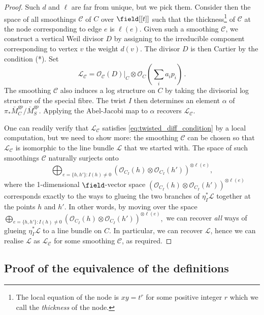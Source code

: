 \documentclass[a4paper,12pt]{article} %
\newcommand{\ca}[1]{{\mathcal{#1}}}
\theoremstyle{definition}
\theoremstyle{plain}%
\begin{document}
\begin{proof}
Such $d$ and $\ell$ are far from unique, but we pick them. Consider then the space of all smoothings $\ca C$ of $C$ over ${\field}[[t]]$ such that the thickness\footnote{The local equation of the node is $xy = t^r$ for some positive integer $r$ which we call the \emph{thickness} of the node. } of $\ca C$ at the node corresponding to edge $e$ is $\ell(e)$. Given such a smoothing $\ca C$, we construct a vertical Weil divisor $D$ by assigning to the irreducible component corresponding to vertex $v$ the weight $d(v)$. The divisor $D$ is then Cartier by the condition (*). Set $$\ca L_{\ca C} = \ca O_{\ca C}(D)|_{C}\otimes \ca O_C(\sum_i a_i p_i)\, .$$
The smoothing $\ca C$ also induces a log structure on $C$ by  taking the divisorial log structure of the special fibre. The twist $I$ then determines an element $\alpha$ of $\pi_*\bar M_C^{gp}/\bar M_S^{gp}$. Applying the Abel-Jacobi map to $\alpha$ recovers $\ca L_{\ca C}$. 

One can readily verify that $\ca L_{\ca C}$ satisfies \eqref{eq:twisted_diff_condition} by a local computation, but we need to show more:  the smoothing $\ca C$ can be chosen so that $\ca L_{\ca C}$ is isomorphic to the line bundle $\ca L$ that we started with. The space of such smoothings $\ca C$ naturally surjects onto 
\begin{equation}
\bigoplus_{e = \{ h, h'\} : I(h) \neq 0} \left( \ca O_{C_I}(h) \otimes \ca O_{C_I}(h')\right)^{\otimes \ell(e)}, 
\end{equation}
where the 1-dimensional $\field$-vector space $\left( \ca O_{C_I}(h) \otimes \ca O_{C_I}(h')\right)^{\otimes \ell(e)}$ corresponds exactly to the ways to glueing the two branches of $\eta_I^*\ca L$ together at the points $h$ and $h'$. In other words, by moving over the space $\bigoplus_{e = \{ h, h'\} : I(h) \neq 0} \left( \ca O_{C_I}(h) \otimes \ca O_{C_I}(h')\right)^{\otimes \ell(e)}, $ we can recover \emph{all} ways of glueing $\eta_I^*\ca L$ to a line bundle on $C$. In particular, we can recover $\ca L$, hence we can realise $\ca L$ as $\ca L_{\ca C}$ for some smoothing $\ca C$, as required. 
\end{proof}

\subsection{Proof of the equivalence of the definitions}\label{sec:proof_of_equiv_defs}
\end{document}
